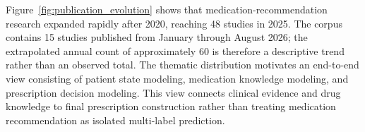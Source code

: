 \documentclass[manuscript,review]{acmart}
\begin{document}
Figure~\ref{fig:publication_evolution} shows that medication-recommendation research expanded rapidly after 2020, reaching 48 studies in 2025. The corpus contains 15 studies published from January through August 2026; the extrapolated annual count of approximately 60 is therefore a descriptive trend rather than an observed total. The thematic distribution motivates an end-to-end view consisting of patient state modeling, medication knowledge modeling, and prescription decision modeling. This view connects clinical evidence and drug knowledge to final prescription construction rather than treating medication recommendation as isolated multi-label prediction.




\end{document}

